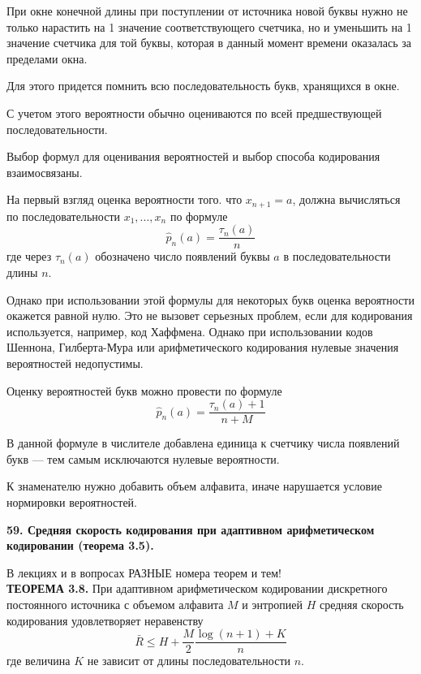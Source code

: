 \documentclass[14pt]{article}
\begin{document}
При окне конечной длины при поступлении от источника новой буквы нужно не только нарастить на 1 значение соответствующего счетчика, но и уменьшить на 1 значение счетчика для той буквы, которая в данный момент времени оказалась за пределами окна.

Для этого придется помнить всю последовательность букв, хранящихся в окне.

С учетом этого вероятности обычно оцениваются по всей предшествующей последовательности.

Выбор формул для оценивания вероятностей и выбор способа кодирования взаимосвязаны.

На первый взгляд оценка вероятности того. что \(x_{n+1} = a\), должна вычисляться по последовательности \(x_1,...,x_n\) по формуле
\begin{displaymath}
    \hat{p}_n(a) = \frac{\tau_n(a)}{n}
\end{displaymath}
где через \(\tau_n(a)\) обозначено число появлений буквы \(a\) в последовательности длины \(n\).

Однако при использовании этой формулы для некоторых букв оценка вероятности окажется равной нулю. Это не вызовет серьезных проблем, если для кодирования используется, например, код Хаффмена. Однако при использовании кодов Шеннона, Гилберта-Мура или арифметического кодирования нулевые значения вероятностей недопустимы.

Оценку вероятностей букв можно провести по формуле
\begin{displaymath}
    \hat{p}_n(a) = \frac{\tau_n(a) + 1}{n + M}
\end{displaymath}

В данной формуле в числителе добавлена единица к счетчику числа появлений букв — тем самым исключаются нулевые вероятности.

К знаменателю нужно добавить объем алфавита, иначе нарушается условие нормировки вероятностей.


\bigskip
\textbf{59. Средняя скорость кодирования при адаптивном арифметическом кодировании (теорема 3.5).}

В лекциях и в вопросах РАЗНЫЕ номера теорем и тем! \\

\textbf{ТЕОРЕМА 3.8.} При адаптивном арифметическом кодировании дискретного постоянного источника с объемом алфавита \(M\) и энтропией \(H\) средняя скорость кодирования удовлетворяет неравенству
\begin{displaymath}
    \bar{R} \leq H + \frac{M}{2}\frac{\log(n + 1) + K}{n}
\end{displaymath}
где величина \(K\) не зависит от длины последовательности \(n\).
\end{document}
